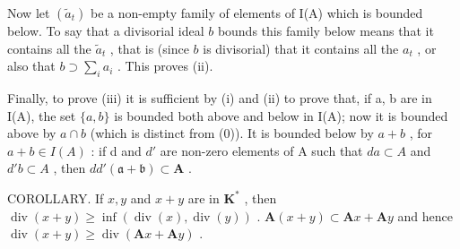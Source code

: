 Now let \((\tilde{a}_t)\) be a non-empty family of elements of I(A) which is bounded below. To say that a divisorial ideal \(b\) bounds this family below means that it contains all the \(\tilde{a}_t\) , that is (since \(b\) is divisorial) that it contains all the \(a_t\) , or also that \(b \supset \sum_{i} a_i\) . This proves (ii).

Finally, to prove (iii) it is sufficient by (i) and (ii) to prove that, if a, b are in I(A), the set \(\{a, b\}\) is bounded both above and below in I(A); now it is bounded above by \(a \cap b\) (which is distinct from (0)). It is bounded below by \(a + b\) , for \(a + b \in I(A)\) : if d and \(d'\) are non-zero elements of A such that \(da \subset A\) and \(d'b \subset A\) , then \(dd'(\mathfrak{a} + \mathfrak{b}) \subset \mathbf{A}\) .

COROLLARY. If \(x, y\) and \(x + y\) are in \(\mathbf{K}^*\) , then \(\operatorname{div}(x + y) \geqslant \inf(\operatorname{div}(x), \operatorname{div}(y))\) . \(\mathbf{A}(x + y) \subset \mathbf{A}x + \mathbf{A}y\) and hence \(\operatorname{div}(x + y) \geqslant \operatorname{div}(\mathbf{A}x + \mathbf{A}y)\) .
